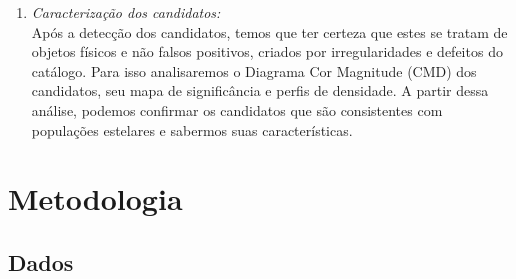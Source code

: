 \documentclass[
	12pt,				%
	openany,			%
	oneside,			%
	a4paper,			%
	english,			%
	brazil				%
	]{abntex2}
\begin{document}
\begin{enumerate}
\item \emph{Caracterização dos candidatos:} \\
Após a detecção dos candidatos, temos que ter certeza que estes se tratam de objetos físicos e não falsos positivos, criados por irregularidades e defeitos do catálogo. Para isso analisaremos o Diagrama Cor Magnitude (CMD) dos candidatos, seu mapa de significância e perfis de densidade. A partir dessa análise, podemos confirmar os candidatos que são consistentes com populações estelares e sabermos suas características.  
\end{enumerate}

\part{Metodologia}


\chapter{Dados}
\label{cha:dados}
\end{document}
